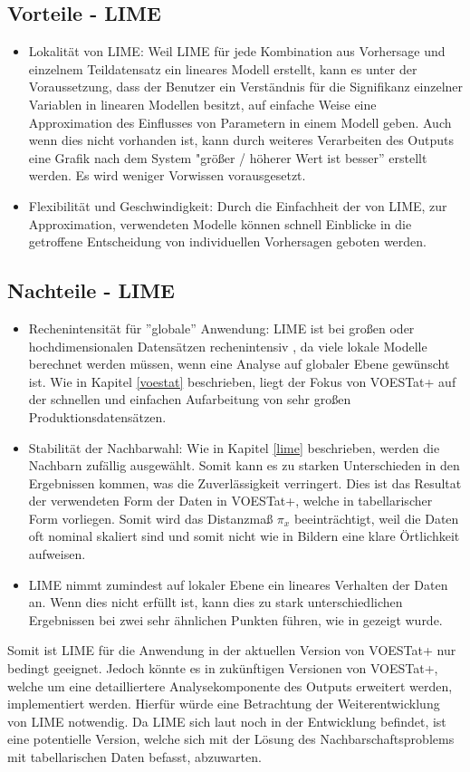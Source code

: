 \documentclass[12pt,titlepage,oneside]{book}
\begin{document}
\subsection{Vorteile - LIME}
\begin{itemize}
    \item Lokalität von LIME: Weil LIME für jede Kombination aus Vorhersage und einzelnem Teildatensatz ein lineares Modell erstellt, kann es unter der Voraussetzung, dass der Benutzer ein Verständnis für die Signifikanz einzelner Variablen in linearen Modellen besitzt, auf einfache Weise eine Approximation des Einflusses von Parametern in einem Modell geben. Auch wenn dies nicht vorhanden ist, kann durch weiteres Verarbeiten des Outputs eine Grafik nach dem System "größer / höherer Wert ist besser'' erstellt werden. Es wird weniger Vorwissen vorausgesetzt.
    \item Flexibilität und Geschwindigkeit: Durch die Einfachheit der von LIME, zur Approximation, verwendeten Modelle können schnell Einblicke in die getroffene Entscheidung von individuellen Vorhersagen geboten werden.
\end{itemize}

\subsection{Nachteile - LIME}
\begin{itemize}
    \item Rechenintensität für ''globale'' Anwendung: LIME ist bei großen oder hochdimensionalen Datensätzen rechenintensiv , da viele lokale Modelle berechnet werden müssen, wenn eine Analyse auf globaler Ebene gewünscht ist. Wie in Kapitel \ref{voestat} beschrieben, liegt der Fokus von VOESTat+ auf der schnellen und einfachen Aufarbeitung von sehr großen Produktionsdatensätzen.
    \item Stabilität der Nachbarwahl: Wie in Kapitel \ref{lime} beschrieben, werden die Nachbarn zufällig ausgewählt. Somit kann es zu starken Unterschieden in den Ergebnissen kommen, was die Zuverlässigkeit verringert. Dies ist das Resultat der verwendeten Form der Daten in VOESTat+, welche in tabellarischer Form vorliegen. Somit wird das Distanzmaß $\pi_x$ beeinträchtigt, weil die Daten oft nominal skaliert sind und somit nicht wie in Bildern eine klare Örtlichkeit aufweisen.
    \item LIME nimmt zumindest auf lokaler Ebene ein lineares Verhalten der Daten an. Wenn dies nicht erfüllt ist, kann dies zu stark unterschiedlichen Ergebnissen bei zwei sehr ähnlichen Punkten führen, wie in \cite{slack2020fooling} gezeigt wurde.
\end{itemize}
Somit ist LIME für die Anwendung in der aktuellen Version von VOESTat+ nur bedingt geeignet. Jedoch könnte es in zukünftigen Versionen von VOESTat+, welche um eine detailliertere Analysekomponente des Outputs erweitert werden, implementiert werden.
Hierfür würde eine Betrachtung der Weiterentwicklung von LIME notwendig. Da LIME sich laut \cite{molnar2020interpretable} noch in der Entwicklung befindet, ist eine potentielle Version, welche sich mit der Lösung des Nachbarschaftsproblems mit tabellarischen Daten befasst, abzuwarten.
\end{document}
